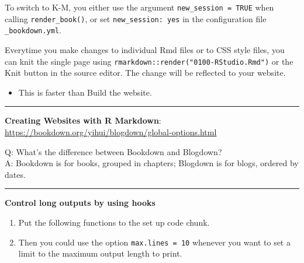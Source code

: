 \documentclass[
  a4paper,
  twoside,
  openright]{book}
\providecommand{\tightlist}{%
  \setlength{\itemsep}{0pt}\setlength{\parskip}{0pt}}
\theoremstyle{definition}
\theoremstyle{definition}
\theoremstyle{definition}
\theoremstyle{definition}
\theoremstyle{remark}
\begin{document}
To switch to K-M, you either use the argument \texttt{new\_session\ =\ TRUE} when calling \texttt{render\_book()}, or set \texttt{new\_session:\ yes} in the configuration file \texttt{\_bookdown.yml}.

Everytime you make changes to individual Rmd files or to CSS style files, you can knit the single page using \texttt{rmarkdown::render("0100-RStudio.Rmd")} or the Knit button in the source editor. The change will be reflected to your website.

\begin{itemize}
\tightlist
\item
  This is faster than Build the website.
\end{itemize}

\begin{center}\rule{0.5\linewidth}{0.5pt}\end{center}

\textbf{Creating Websites with R Markdown}: \url{https://bookdown.org/yihui/blogdown/global-options.html}

Q: What's the difference between Bookdown and Blogdown?\\
A: Bookdown is for books, grouped in chapters; Blogdown is for blogs, ordered by dates.

\begin{center}\rule{0.5\linewidth}{0.5pt}\end{center}

\textbf{Control long outputs by using hooks}

\begin{enumerate}
\def\labelenumi{\arabic{enumi}.}
\item
  Put the following functions to the set up code chunk.
\item
  Then you could use the option \texttt{max.lines\ =\ 10} whenever you want to set a limit to the maximum output length to print.
\end{enumerate}
\end{document}
